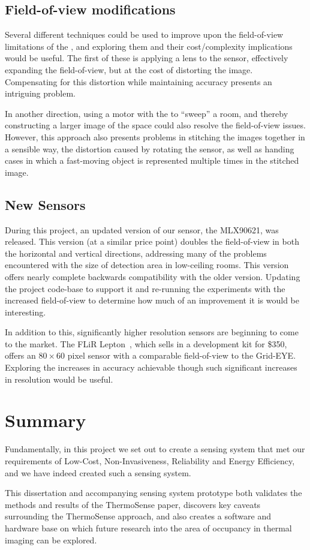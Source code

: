 \documentclass[../thesis/thesis.tex]{subfiles}
\begin{document}
\subsection{Field-of-view modifications}
Several different techniques could be used to improve upon the field-of-view limitations of the \mlx, and exploring them and their cost/complexity implications would be useful. The first of these is applying a lens to the sensor, effectively expanding the field-of-view, but at the cost of distorting the image. Compensating for this distortion while maintaining accuracy presents an intriguing problem.

In another direction, using a motor with the \mlx to ``sweep'' a room, and thereby constructing a larger image of the space could also resolve the field-of-view issues. However, this approach also presents problems in stitching the images together in a sensible way, the distortion caused by rotating the sensor, as well as handing cases in which a fast-moving object is represented multiple times in the stitched image.

\subsection{New Sensors}
During this project, an updated version of our sensor, the MLX90621, was released. This version (at a similar price point) doubles the field-of-view in both the horizontal and vertical directions, addressing many of the problems encountered with the size of detection area in low-ceiling rooms. This version offers nearly complete backwards compatibility with the older version. Updating the project code-base to support it and re-running the experiments with the increased field-of-view to determine how much of an improvement it is would be interesting.

In addition to this, significantly higher resolution sensors are beginning to come to the market. The FLiR Lepton~\cite{flir}, which sells in a development kit for \$350, offers an $80 \times 60$ pixel sensor with a comparable field-of-view to the Grid-EYE. Exploring the increases in accuracy achievable though such significant increases in resolution would be useful.

\section{Summary}
Fundamentally, in this project we set out to create a sensing system that met our requirements of Low-Cost, Non-Invasiveness, Reliability and Energy Efficiency, and we have indeed created such a sensing system. %

This dissertation and accompanying sensing system prototype both validates the methods and results of the ThermoSense paper, discovers key caveats surrounding the ThermoSense approach, and also creates a software and hardware base on which future research into the area of occupancy in thermal imaging can be explored.
 
\end{document}
